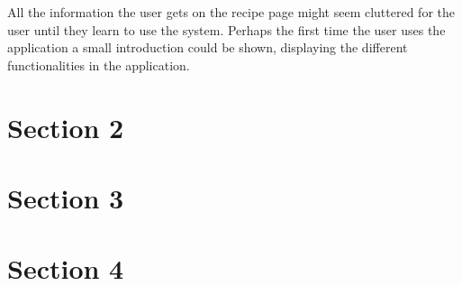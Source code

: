 All the information the user gets on the recipe page might seem cluttered for the user until they learn to use the system. Perhaps the first time the user uses the application a small introduction could be shown, displaying the different functionalities in the application.



\section*{Section 2}



\section*{Section 3}


\section*{Section 4}

